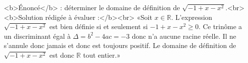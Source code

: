 <b>Énoncé</b> : déterminer le domaine de définition de $\sqrt{-1+x-x^2}$.<br> <b>Solution rédigée à évaluer :</b><br>  «Soit $x\in\mathbb{R}$.  L'expression $\sqrt{-1+x-x^2}$ est bien définie si et seulement si $-1+x-x^2\geq 0$. Ce trinôme a un discriminant égal à $\Delta=b^2-4ac=-3$ donc n'a aucune racine réelle. Il ne s'annule donc jamais et donc est toujours positif. Le domaine de définition de $\sqrt{-1+x-x^2}$ est donc $\mathbb{R}$ tout entier.»

\begin{reponses}
\end{reponses}

\begin{comment}
Discriminant correct mais le trinôme est négatif.
\end{comment}


